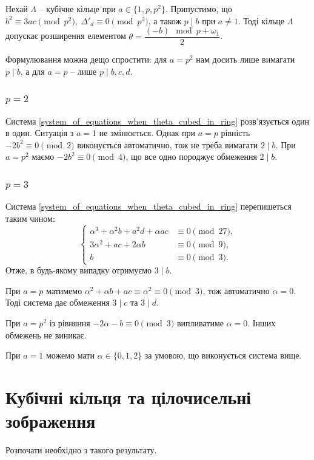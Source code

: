 \documentclass{thesis}
\begin{document}
\begin{proposition}
Нехай $\Lambda$ -- кубічне кільце при $a \in \{1,p,p^2\}$. Припустимо, що $b^2 \equiv 3 ac \pmod {p^2},\ \Delta'_d \equiv 0 \pmod {p^3}$, а також $p \mid b$ при $a \neq 1$. Тоді кільце $\Lambda$ допускає розширення елементом $\theta = \dfrac{(-b)\mod p + \omega_1}{2}$.
\end{proposition}

Формулювання можна дещо спростити: для $a = p^2$ нам досить лише вимагати $p \mid b$, а для $a = p$ -- лише $p \mid b,c,d$.

\subsection*{$p = 2$}
Система \eqref{system_of_equations_when_theta_cubed_in_ring} розв'язується один в один. Ситуація з $a = 1$ не змінюється. Однак при $a = p$ рівність $-2b^2 \equiv 0 \pmod 2$ виконується автоматично, тож не треба вимагати $2 \mid b$. При $a = p^2$ маємо $-2b^2 \equiv 0 \pmod {4}$, що все одно породжує обмеження $2 \mid b$.

\subsection*{$p = 3$}
 Система \eqref{system_of_equations_when_theta_cubed_in_ring} перепишеться таким чином:
\begin{equation*}
    \begin{cases}
      \alpha^3 + \alpha^2 b + a^2 d + \alpha a c & \equiv 0 \pmod {27}, \\
    3\alpha^2 + ac + 2 \alpha b & \equiv 0 \pmod {9}, \\
     b & \equiv 0 \pmod 3.
    \end{cases}
\end{equation*}
Отже, в будь-якому випадку отримуємо $3 \mid b$.

При $a = p$ матимемо $\alpha^2 + \alpha b + ac \equiv \alpha^2 \equiv 0 \pmod 3$, тож автоматично $\alpha = 0$. Тоді система дає обмеження $3 \mid c$ та $3 \mid d$. 

При $a = p^2$ із рівняння $-2\alpha -b \equiv 0 \pmod 3$ випливатиме $\alpha = 0$. Інших обмежень не виникає.

При $a = 1$ можемо мати $\alpha \in \{0,1,2\}$ за умовою, що виконується система вище. 
\newpage

\chapter{Кубічні кільця та цілочисельні зображення}\label{chaper3}
Розпочати необхідно з такого результату.
\end{document}
